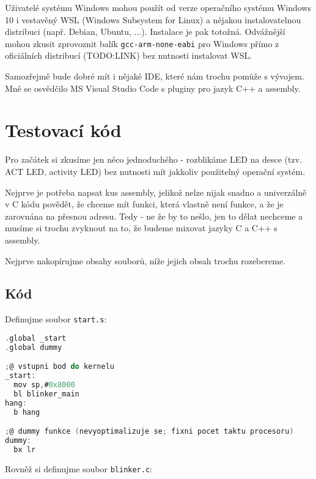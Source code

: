 \documentclass{article}
\begin{document}
Uživatelé systému Windows mohou použít od verze operačního systému Windows 10 i vestavěný WSL (Windows Subsystem for Linux) a nějakou instalovatelnou distribuci (např. Debian, Ubuntu, ...). Instalace je pak totožná. Odvážnější mohou zkusit zprovoznit balík \texttt{gcc-arm-none-eabi} pro Windows přímo z oficiálních distribucí (TODO:LINK) bez nutnosti instalovat WSL.

Samozřejmě bude dobré mít i nějaké IDE, které nám trochu pomůže s vývojem. Mně se osvědčilo MS Visual Studio Code s pluginy pro jazyk C++ a assembly.



\section{Testovací kód}

Pro začátek si zkusíme jen něco jednoduchého - rozblikáme LED na desce (tzv. ACT LED, activity LED) bez nutnosti mít jakkoliv použitelný operační systém.

Nejprve je potřeba napsat kus assembly, jelikož nelze nijak snadno a univerzálně v C kódu povědět, že chceme mít funkci, která vlastně není funkce, a že je zarovnána na přesnou adresu. Tedy - ne že by to nešlo, jen to dělat nechceme a musíme si trochu zvyknout na to, že budeme mixovat jazyky C a C++ s assembly.

Nejprve nakopírujme obsahy souborů, níže jejich obsah trochu rozebereme.

\subsection{Kód}

Definujme soubor \texttt{start.s}:

\begin{lstlisting}[language=C]
.global _start
.global dummy

;@ vstupni bod do kernelu
_start:
  mov sp,#0x8000
  bl blinker_main
hang:
  b hang

;@ dummy funkce (nevyoptimalizuje se; fixni pocet taktu procesoru)
dummy:
  bx lr
\end{lstlisting}

Rovněž si definujme soubor \texttt{blinker.c}:
\end{document}

